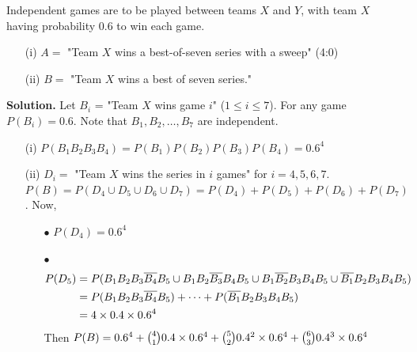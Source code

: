 \documentclass[english, 11pt]{article}
\begin{document}
  \begin{exmp}
    Independent games are to be played between teams $X$ and $Y$, with team $X$ having probability 0.6 to win each game.
    \begin{itemize}
      \item[(i)] $A = $ "Team $X$ wins a best-of-seven series with a sweep" (4:0)
      \item[(ii)] $B = $ "Team $X$ wins a best of seven series."
    \end{itemize}

   \textbf{Solution.} Let $B_i$ = "Team $X$ wins game $i$" ($1 \leq i \leq 7$). For any game $P(B_i) = 0.6$. Note that $B_1, B_2, \ldots, B_7$ are independent.
   \begin{itemize}
     \item[(i)] $P(B_1B_2B_3B_4) = P(B_1)P(B_2)P(B_3)P(B_4) = 0.6^4$
     \item[(ii)] $D_i = $ "Team $X$ wins the series in $i$ games" for $i = 4,5,6,7$. \\ $P(B) = P(D_4\cup D_5 \cup D_6 \cup D_7) = P(D_4) + P(D_5) + P(D_6) + P(D_7)$. Now,
     \begin{itemize}
       \item[$\bullet$] $P(D_4) = 0.6^4$
       \item[$\bullet$] \begin{align*}
         P(D_5) & = P(B_1B_2B_3\overline{B_4}B_5 \cup B_1B_2\overline{B_3}B_4B_5 \cup B_1\overline{B_2}B_3B_4B_5 \cup \overline{B_1}B_2B_3B_4B_5) \\
         & = P(B_1B_2B_3\overline{B_4}B_5) + \cdots + P(\overline{B_1}B_2B_3B_4B_5) \\
         & = 4 \times 0.4 \times 0.6^4
       \end{align*}
       Then $P(B) = 0.6^4 + {4 \choose 1}0.4\times 0.6^4 + {5 \choose 2} 0.4^2 \times 0.6^4 + {6 \choose 3} 0.4^3 \times 0.6^4$
     \end{itemize}
   \end{itemize}
  \end{exmp}
\end{document}
